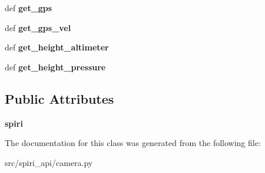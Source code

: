 \begin{DoxyCompactItemize}
\item 
\hypertarget{classspiri__api_1_1camera_1_1spiri__api__python_ab76820aafb40309b24303d6d40f49a52}{def {\bfseries get\-\_\-gps}}\label{classspiri__api_1_1camera_1_1spiri__api__python_ab76820aafb40309b24303d6d40f49a52}

\item 
\hypertarget{classspiri__api_1_1camera_1_1spiri__api__python_a2d8a9392961842e96452bfba555ddd54}{def {\bfseries get\-\_\-gps\-\_\-vel}}\label{classspiri__api_1_1camera_1_1spiri__api__python_a2d8a9392961842e96452bfba555ddd54}

\item 
\hypertarget{classspiri__api_1_1camera_1_1spiri__api__python_a49498a715c2022dba9bdb6af0cb3e3b9}{def {\bfseries get\-\_\-height\-\_\-altimeter}}\label{classspiri__api_1_1camera_1_1spiri__api__python_a49498a715c2022dba9bdb6af0cb3e3b9}

\item 
\hypertarget{classspiri__api_1_1camera_1_1spiri__api__python_af13525eaee4131453a8755e57f7f5836}{def {\bfseries get\-\_\-height\-\_\-pressure}}\label{classspiri__api_1_1camera_1_1spiri__api__python_af13525eaee4131453a8755e57f7f5836}

\end{DoxyCompactItemize}
\subsection*{\-Public \-Attributes}
\begin{DoxyCompactItemize}
\item 
\hypertarget{classspiri__api_1_1camera_1_1spiri__api__python_aa75408dd4a535871cc9c9278119bef8e}{{\bfseries spiri}}\label{classspiri__api_1_1camera_1_1spiri__api__python_aa75408dd4a535871cc9c9278119bef8e}

\end{DoxyCompactItemize}


\-The documentation for this class was generated from the following file\-:\begin{DoxyCompactItemize}
\item 
src/spiri\-\_\-api/camera.\-py\end{DoxyCompactItemize}
